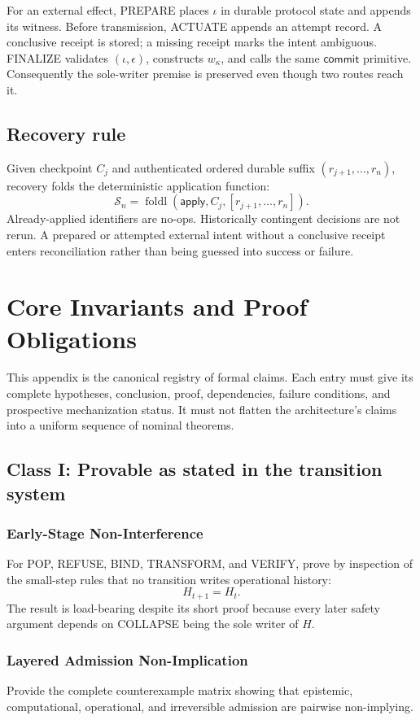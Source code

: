 \documentclass[11pt,openany]{book}
\begin{document}
For an external effect, PREPARE places \(\iota\) in durable protocol state and
appends its witness. Before transmission, ACTUATE appends an attempt record.
A conclusive receipt is stored; a missing receipt marks the intent ambiguous.
FINALIZE validates \((\iota,\epsilon)\), constructs \(w_\kappa\), and calls the
same \(\mathsf{commit}\) primitive. Consequently the sole-writer premise is
preserved even though two routes reach it.

\section{Recovery rule}
Given checkpoint \(C_j\) and authenticated ordered durable suffix
\((r_{j+1},\ldots,r_n)\), recovery folds the deterministic application
function:
\[
 \mathcal S_n=
 \operatorname{foldl}(\mathsf{apply},C_j,
                     [r_{j+1},\ldots,r_n]).
\]
Already-applied identifiers are no-ops. Historically contingent decisions are
not rerun. A prepared or attempted external intent without a conclusive receipt
enters reconciliation rather than being guessed into success or failure.

\chapter{Core Invariants and Proof Obligations}
This appendix is the canonical registry of formal claims. Each entry must give
its complete hypotheses, conclusion, proof, dependencies, failure conditions,
and prospective mechanization status. It must not flatten the architecture's
claims into a uniform sequence of nominal theorems.

\section{Class I: Provable as stated in the transition system}

\subsection{Early-Stage Non-Interference}
For POP, REFUSE, BIND, TRANSFORM, and VERIFY, prove by inspection of the
small-step rules that no transition writes operational history:
\[
  H_{t+1}=H_t.
\]
The result is load-bearing despite its short proof because every later safety
argument depends on COLLAPSE being the sole writer of \(H\).

\subsection{Layered Admission Non-Implication}
Provide the complete counterexample matrix showing that epistemic,
computational, operational, and irreversible admission are pairwise
non-implying.
\end{document}
